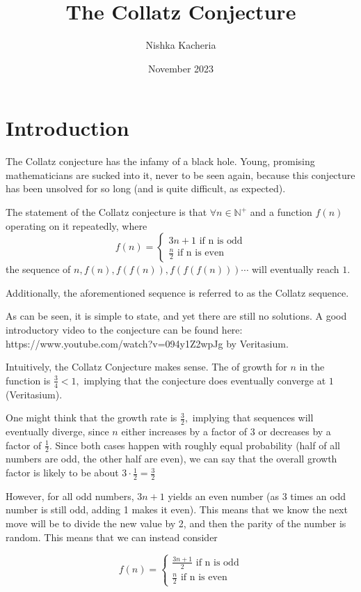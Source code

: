 \documentclass{article}
\title{The Collatz Conjecture}
\author{Nishka Kacheria}
\date{November 2023}
\theoremstyle{remark}
\theoremstyle{problem}
\numberwithin{problem}{subsection}
\numberwithin{Problem}{section}
\theoremstyle{definition}
\theoremstyle{definition}
\theoremstyle{definition}
\begin{document}

\maketitle

\section{Introduction}
The Collatz conjecture has the infamy of a black hole. Young, promising mathematicians are sucked into it, never to be seen again, because this conjecture has been unsolved for so long (and is quite difficult, as expected). 

The statement of the Collatz conjecture is that $\forall n \in \mathbb{N^{+}} $ and a function $f(n)$ operating on it repeatedly, where 
$$f(n) = \begin{cases}
    3n + 1 \text{ if n is odd} \\
    \frac{n}{2} \text{ if n is even}
\end{cases}$$
the sequence of $n, f(n), f(f(n)), f(f(f(n))) \cdots $ will eventually reach $1.$

Additionally, the aforementioned sequence is referred to as the Collatz sequence. 

As can be seen, it is simple to state, and yet there are still no solutions. 
A good introductory video to the conjecture can be found here: https://www.youtube.com/watch?v=094y1Z2wpJg by Veritasium. 

Intuitively, the Collatz Conjecture makes sense. The of growth for $n$ in the function is $\frac{3}{4} < 1,$ implying that the conjecture does eventually converge at $1$ (Veritasium). 

One might think that the growth rate is $\frac{3}{2},$ implying that sequences will eventually diverge, since $n$ either increases by a factor of $3$ or decreases by a factor of $\frac{1}{2}.$ Since both cases happen with roughly equal probability (half of all numbers are odd, the other half are even), we can say that the overall growth factor is likely to be about $3 \cdot \frac{1}{2} = \frac{3}{2}$

However, for all odd numbers, $3n + 1$ yields an even number (as 3 times an odd number is still odd, adding 1 makes it even). This means that we know the next move will be to divide the new value by 2, and then the parity of the number is random. This means that we can instead consider 

$$f(n) = \begin{cases}
    \frac{3n + 1}{2} \text{ if n is odd} \\
    \frac{n}{2} \text{ if n is even}
\end{cases}$$
\end{document}
